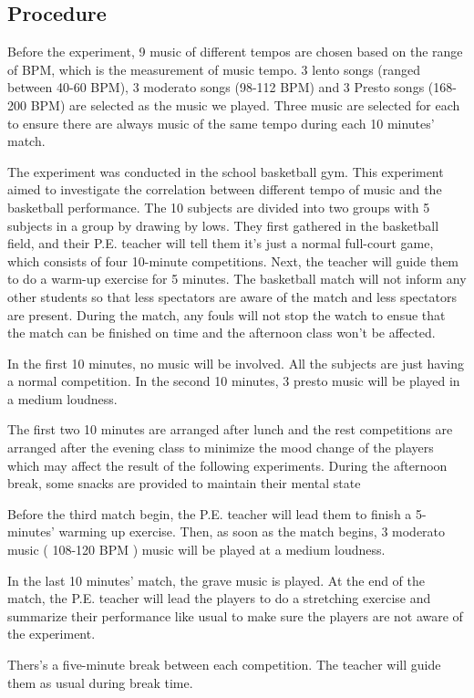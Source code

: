 \documentclass{article}
\begin{document}
\subsection{Procedure}
Before the experiment, 9 music of different tempos are chosen based on the range of BPM, which is the measurement of music tempo. 3 lento songs (ranged between 40-60 BPM), 3 moderato songs (98-112 BPM) and 3 Presto songs (168-200 BPM) are selected as the music we played.\autocite{HelloMusicTheory2022} Three music are selected for each to ensure there are always music of the same tempo during each 10 minutes' match.

The experiment was conducted in the school basketball gym. This experiment aimed to investigate the correlation between different tempo of music and the basketball performance. The 10 subjects are divided into two groups with 5 subjects in a group by drawing by lows. They first gathered in the basketball field, and their P.E. teacher will tell them it's just a normal full-court game, which consists of four 10-minute competitions. Next, the teacher will guide them to do a warm-up exercise for 5 minutes. The basketball match will not inform any other students so that less spectators are aware of the match and less spectators are present. During the match, any fouls will not stop the watch to ensue that the match can be finished on time and the afternoon class won't be affected.

In the first 10 minutes, no music will be involved. All the subjects are just having a normal competition. In the second 10 minutes, 3 presto music will be played in a medium loudness.

The first two 10 minutes are arranged after lunch and the rest competitions are arranged after the evening class to minimize the mood change of the players which may affect the result of the following experiments. During the afternoon break, some snacks are provided to maintain their mental state

Before the third match begin, the P.E. teacher will lead them to finish a 5-minutes' warming up exercise. Then, as soon as the match begins, 3 moderato music ( 108-120 BPM ) music will be played at a medium loudness.

In the last 10 minutes' match, the grave music is played. At the end of the match, the P.E. teacher will lead the players to do a stretching exercise and summarize their performance like usual to make sure the players are not aware of the experiment.

Thers's a five-minute break between each competition. The teacher will guide them as usual during break time.
\end{document}
